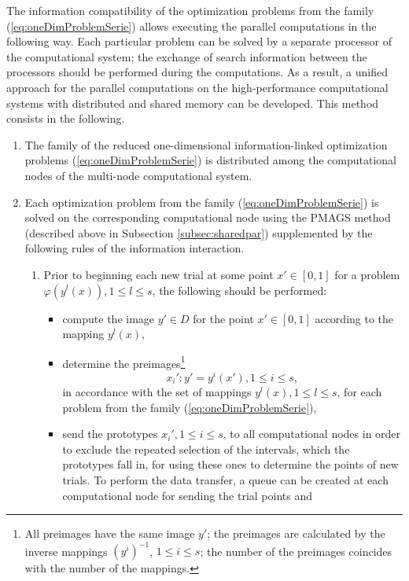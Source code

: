 \documentclass{naco}
\theoremstyle{definition}
\begin{document}
The information compatibility of the optimization problems from the family (\ref{eq:oneDimProblemSerie})
allows executing the parallel computations in the following way. Each particular
problem can be solved by a separate processor of the computational system; the exchange
of search information between the processors should be performed during the computations.
As a result, a unified approach for the parallel computations on the high-performance
computational systems with distributed and shared memory can be developed. This method consists in the following.
\begin{enumerate}
  \item The family of the reduced one-dimensional information-linked optimization
  problems (\ref{eq:oneDimProblemSerie}) is distributed among the computational nodes of the multi-node computational system.
  \item Each optimization problem from the family (\ref{eq:oneDimProblemSerie}) is solved on the
  corresponding computational node using the PMAGS method (described above in Subsection \ref{subsec:sharedpar})
  supplemented by the following rules of the information interaction.
  \begin{enumerate}
    \item Prior to beginning each new trial at some point \(x'\in [0,1]\) for a problem \(\varphi(y^l(x)),1\leq l\leq s\), the following should be performed:
    \begin{itemize}
      \item compute the image \(y'\in D\) for the point \(x'\in [0, 1]\) according to the mapping \(y^l(x)\),
      \item determine  the preimages\footnote{All preimages have the same
      image \(y'\); the preimages are calculated by the inverse mappings \((y^i)^{-1}\), \(1\le i\le s\);
      the number of the preimages coincides with the number of the mappings.}
      \begin{displaymath}
        x_i':y'=y^i(x'),1\le i\le s,
      \end{displaymath}
      in accordance with the set of mappings \(y^l(x), 1\le l\le s\), for each problem from the family (\ref{eq:oneDimProblemSerie}),
      \item send the prototypes \(x_i',1\leq i\leq s\), to all computational nodes in order
      to exclude the repeated selection of the intervals, which the prototypes fall in,
      for using these ones to determine the points of new trials. To perform the data transfer,
      a queue can be created at each computational node for sending the trial points and

\end{itemize}
\end{enumerate}
\end{enumerate}
\end{document}
